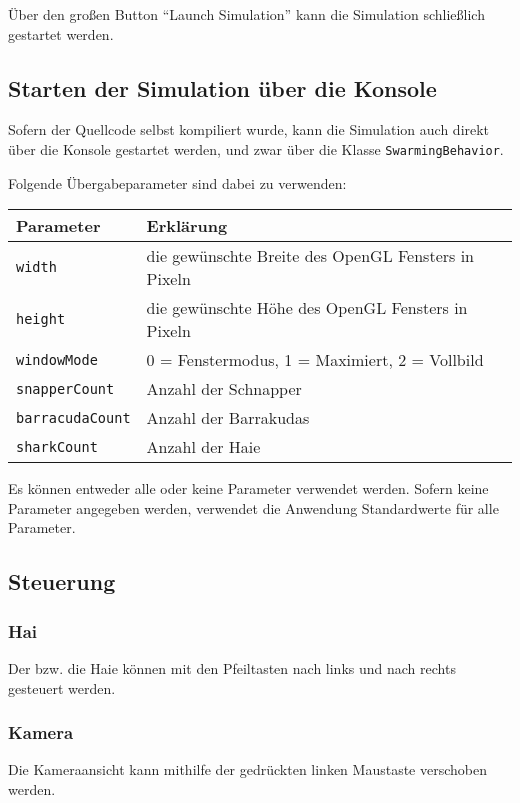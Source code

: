 \documentclass[11pt]{article}
\begin{document}
\vspace{0.5em}
Über den großen Button ``Launch Simulation'' kann die Simulation schließlich gestartet werden.

\subsection{Starten der Simulation über die Konsole}
Sofern der Quellcode selbst kompiliert wurde, kann die Simulation auch direkt über die Konsole gestartet werden, und zwar über die Klasse \lstinline{SwarmingBehavior}.

\vspace{0.5em}
Folgende Übergabeparameter sind dabei zu verwenden:

\vspace{0.5em}
\begin{tabular}{|l|l|}
\hline
	\textbf{Parameter} & \textbf{Erklärung}\\
\hline
\hline
	\lstinline[]$width$  & die gewünschte Breite des OpenGL Fensters in Pixeln\\
\hline
	\lstinline[]$height$ & die gewünschte Höhe des OpenGL Fensters in Pixeln\\
\hline
	\lstinline[]$windowMode$ & 0 = Fenstermodus, 1 = Maximiert, 2 = Vollbild\\
\hline
	\lstinline[]$snapperCount$ & Anzahl der Schnapper\\
\hline
	\lstinline[]$barracudaCount$ & Anzahl der Barrakudas\\
\hline
	\lstinline[]$sharkCount$ & Anzahl der Haie\\
\hline
\end{tabular}

\vspace{0.5em}
Es können entweder alle oder keine Parameter verwendet werden. Sofern keine Parameter angegeben werden, verwendet die Anwendung Standardwerte für alle Parameter.

\subsection{Steuerung}
\subsubsection{Hai}
Der bzw. die Haie können mit den Pfeiltasten nach links und nach rechts gesteuert werden.
\subsubsection{Kamera}
Die Kameraansicht kann mithilfe der gedrückten linken Maustaste verschoben werden.
\end{document}
